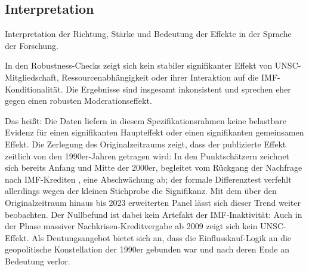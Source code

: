 \subsection{Interpretation}
Interpretation der Richtung, Stärke und Bedeutung der Effekte in der Sprache der Forschung.


In den Robustness-Checks zeigt sich kein stabiler signifikanter Effekt von UNSC-Mitgliedschaft, Ressourcenabhängigkeit 
oder ihrer Interaktion auf die IMF-Konditionalität. 
Die Ergebnisse sind insgesamt inkonsistent und sprechen eher gegen einen robusten Moderationseffekt.

Das heißt: Die Daten liefern in diesem Spezifikationsrahmen keine belastbare Evidenz für einen signifikanten Haupteffekt 
oder einen signifikanten gemeinsamen Effekt.
Die Zerlegung des Originalzeitraums zeigt, dass der publizierte Effekt zeitlich von den 1990er-Jahren getragen wird: In den Punktschätzern zeichnet sich bereits Anfang und Mitte der 2000er, begleitet vom Rückgang der Nachfrage nach IMF-Krediten \parencite[545]{KentikelenisIMFConditionalityDevelopment2016}, eine Abschwächung ab; der formale Differenztest verfehlt allerdings wegen der kleinen Stichprobe die Signifikanz. Mit dem über den Originalzeitraum hinaus bis 2023 erweiterten Panel lässt sich dieser Trend weiter beobachten. Der Nullbefund ist dabei kein Artefakt der IMF-Inaktivität: Auch in der Phase massiver Nachkrisen-Kreditvergabe ab 2009 zeigt sich kein UNSC-Effekt. Als Deutungsangebot bietet sich an, dass die Einflusskauf-Logik an die geopolitische Konstellation der 1990er gebunden war und nach deren Ende an Bedeutung verlor.


